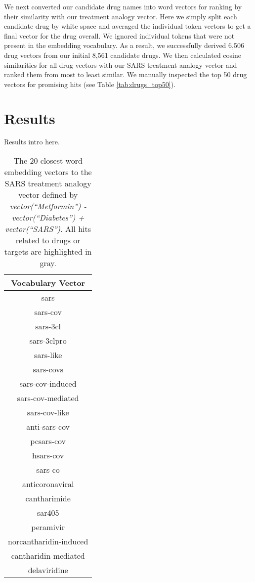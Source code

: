 \documentclass{article}
\newcommand{\lgc}[1]{\cellcolor[gray]{0.85}#1}
\begin{document}
We next converted our candidate drug names into word vectors for ranking by their similarity with our treatment analogy vector.
Here we simply split each candidate drug by white space and averaged the individual token vectors to get a final vector for the drug overall.
We ignored individual tokens that were not present in the embedding vocabulary.
As a result, we successfully derived 6,506 drug vectors from our initial 8,561 candidate drugs.
We then calculated cosine similarities for all drug vectors with our SARS treatment analogy vector and ranked them from most to least similar.
We manually inspected the top 50 drug vectors for promising hits (see Table \ref{tab:drugs_top50}).

\section{Results}

Results intro here.

\begin{table}[ht]
\small
\centering
\caption{The 20 closest word embedding vectors to the SARS treatment analogy vector defined by \emph{vector(``Metformin'') - vector(``Diabetes'') + vector(``SARS'')}. All hits related to drugs or targets are highlighted in gray.}
\label{tab:analogy_top20}
\begin{tabular}{c}
\hline
Vocabulary Vector \\
\hline
sars \\
sars-cov \\
\lgc{sars-3cl} \\
\lgc{sars-3clpro} \\
sars-like \\
sars-covs \\
sars-cov-induced \\
sars-cov-mediated \\
sars-cov-like \\
anti-sars-cov \\
pcsars-cov \\
hsars-cov \\
sars-co \\
anticoronaviral \\
\lgc{cantharimide} \\
\lgc{sar405} \\
\lgc{peramivir} \\
norcantharidin-induced \\
cantharidin-mediated \\
\lgc{delaviridine} \\
\hline
\end{tabular}
\end{table}
\end{document}
